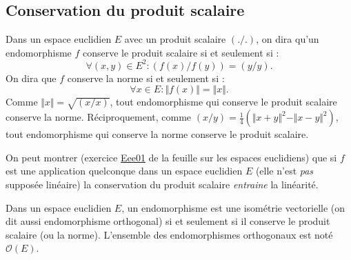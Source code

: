 \subsection{Conservation du produit scalaire}
Dans un espace euclidien $E$ avec un produit scalaire $(./.)$, on dira qu'un endomorphisme $f$ conserve le produit scalaire si et seulement si :
\begin{displaymath}
 \forall(x,y)\in E^2 : (f(x)/f(y)) = (y/y).
\end{displaymath}
On dira que $f$ conserve la norme si et seulement si :
\begin{displaymath}
 \forall x\in E : \Vert f(x)\Vert = \Vert x \Vert.
\end{displaymath}
Comme $\Vert x \Vert = \sqrt{(x/x)}$, tout endomorphisme qui conserve le produit scalaire conserve la norme. Réciproquement, comme $(x/y)=\frac{1}{4}\left(\Vert x+y\Vert^2  - \Vert x-y\Vert^2\right)$, tout endomorphisme qui conserve la norme conserve le produit scalaire.
\begin{rem}
  On peut montrer (exercice \hyperref{\urlexo _fex_ee.pdf}{exo}{Eee01}{Eee01} de la feuille sur les espaces euclidiens) que si $f$ est une application quelconque dans un espace euclidien $E$ (elle n'est \emph{pas} supposée linéaire) la conservation du produit scalaire \emph{entraine} la linéarité.
\end{rem}
\newpage
\begin{defi}
 Dans un espace euclidien $E$, un endomorphisme est une isométrie vectorielle (on dit aussi endomorphisme orthogonal) si et seulement si il conserve le produit scalaire (ou la norme). L'ensemble des endomorphismes orthogonaux est noté $\mathcal O(E)$.
\end{defi}

